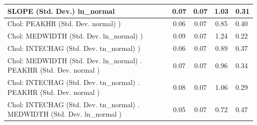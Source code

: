 \begin{table}
\begin{center}
\begin{tabular}{|l|l|c|c|c|l|}
			\hline
			SLOPE (Std. Dev.) ln_normal &  & 0.07 & 0.07 & 1.03 & 0.31 \\
			\hline
			 Chol: PEAKHR (Std. Dev. normal) ) &  & 0.06 & 0.07 & 0.85 & 0.40 \\
			\hline
			 Chol: MEDWIDTH (Std. Dev. ln_normal) ) &  & 0.09 & 0.07 & 1.24 & 0.22 \\
			\hline
			 Chol: INTECHAG (Std. Dev. tn_normal) ) &  & 0.06 & 0.07 & 0.89 & 0.37 \\
			\hline
			 Chol: MEDWIDTH (Std. Dev. ln_normal) . PEAKHR (Std. Dev.   normal ) &  & 0.07 & 0.07 & 0.96 & 0.34 \\
			\hline
			 Chol: INTECHAG (Std. Dev. tn_normal) . PEAKHR (Std. Dev.   normal ) &  & 0.08 & 0.07 & 1.06 & 0.29 \\
			\hline
			 Chol: INTECHAG (Std. Dev. tn_normal) . MEDWIDTH (Std. Dev.   ln_normal ) &  & 0.05 & 0.07 & 0.72 & 0.47 \\
			\hline
		\end{tabular}
	\end{center}
\end{table}